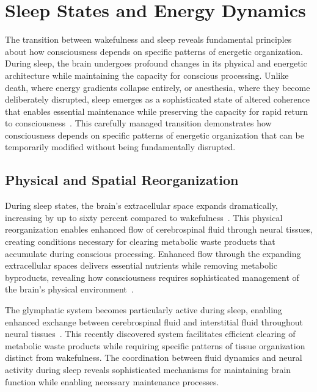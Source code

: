 \section{Sleep States and Energy Dynamics}

The transition between wakefulness and sleep reveals fundamental principles about how consciousness depends on specific patterns of energetic organization. During sleep, the brain undergoes profound changes in its physical and energetic architecture while maintaining the capacity for conscious processing. Unlike death, where energy gradients collapse entirely, or anesthesia, where they become deliberately disrupted, sleep emerges as a sophisticated state of altered coherence that enables essential maintenance while preserving the capacity for rapid return to consciousness~\cite{da2024mathematical, bosl2025dynamical}. This carefully managed transition demonstrates how consciousness depends on specific patterns of energetic organization that can be temporarily modified without being fundamentally disrupted.

\subsection*{Physical and Spatial Reorganization}

During sleep states, the brain's extracellular space expands dramatically, increasing by up to sixty percent compared to wakefulness~\cite{amil2024theta}. This physical reorganization enables enhanced flow of cerebrospinal fluid through neural tissues, creating conditions necessary for clearing metabolic waste products that accumulate during conscious processing. Enhanced flow through the expanding extracellular spaces delivers essential nutrients while removing metabolic byproducts, revealing how consciousness requires sophisticated management of the brain's physical environment~\cite{bosl2025dynamical}.

The glymphatic system becomes particularly active during sleep, enabling enhanced exchange between cerebrospinal fluid and interstitial fluid throughout neural tissues~\cite{zheng2025unbearable}. This recently discovered system facilitates efficient clearing of metabolic waste products while requiring specific patterns of tissue organization distinct from wakefulness. The coordination between fluid dynamics and neural activity during sleep reveals sophisticated mechanisms for maintaining brain function while enabling necessary maintenance processes.

